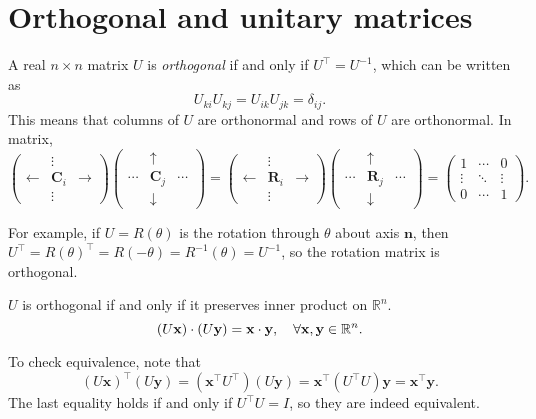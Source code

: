 \documentclass[10pt]{article}
\begin{document}
    \section{Orthogonal and unitary matrices}
    \begin{definition}
        A real $ n\times n $ matrix $U$ is \textit{orthogonal} if and only if $ U^{\top}=U^{-1} $, which can be written as 
        \[
            U_{ki}U_{kj}=U_{ik}U_{jk}=\delta_{ij}
        .\]
        This means that columns of $U$ are orthonormal and rows of $U$ are orthonormal. In matrix,
        \[
            \begin{pmatrix}
                &\vdots&\\
                \leftarrow & \mathbf{C}_i& \rightarrow \\
                &\vdots&
            \end{pmatrix}
            \begin{pmatrix}
                &\uparrow&\\
                \cdots&\mathbf{C}_j&\cdots\\
                &\downarrow &
            \end{pmatrix}
            =
            \begin{pmatrix}
                &\vdots&\\
                \leftarrow & \mathbf{R}_i& \rightarrow \\
                &\vdots&
            \end{pmatrix}
            \begin{pmatrix}
                &\uparrow&\\
                \cdots&\mathbf{R}_j&\cdots\\
                &\downarrow &
            \end{pmatrix}
            =
            \begin{pmatrix}
                1&\cdots&0\\
                \vdots&\ddots &\vdots \\
                0&\cdots &1
            \end{pmatrix}
        .\]
    \end{definition}
    For example, if $U=R(\theta)$ is the rotation through $ \theta $ about axis $\mathbf{n}$, then $ U^{\top}=R(\theta)^{\top}=R(-\theta)=R^{-1}(\theta)=U^{-1} $, so the rotation matrix is orthogonal.

    \begin{definition}
        $U$ is orthogonal if and only if it preserves inner product on $ \mathbb{R}^{n} $.
        \[
            (U \mathbf{x})\cdot (U \mathbf{y})=\mathbf{x}\cdot \mathbf{y}, \quad \forall {\bf x},{\bf y}\in \mathbb{R}^{n}
        .\]
    \end{definition}
    To check equivalence, note that 
    \[
        (U \mathbf{x})^{\top}(U \mathbf{y})=(\mathbf{x}^{\top} U^{\top})(U \mathbf{y})=\mathbf{x}^{\top}(U^{\top}U)\mathbf{y}=\mathbf{x}^{\top} \mathbf{y}
    .\]
    The last equality holds if and only if $ U^{\top}U=I $, so they are indeed equivalent.
\end{document}
